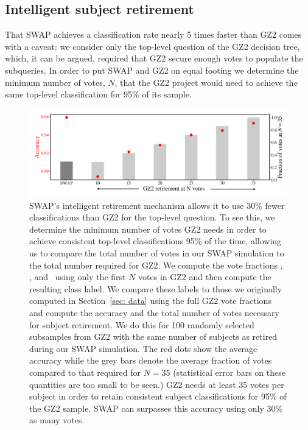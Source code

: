 \subsection{Intelligent subject retirement}\label{sec: swap is faster}

That SWAP achieves a classification rate nearly 5 times faster than GZ2 comes with a caveat: we consider only the top-level question of the GZ2 decision tree, which, it can be argued, required that GZ2 secure enough votes to populate the subqueries.  In order to put SWAP and GZ2 on equal footing we determine the minimum number of votes, $N$, that the GZ2 project would need to achieve the same top-level classification for 95\% of its sample.

\begin{figure}
\includegraphics[width=\linewidth]{Figures/human_machine/f15.pdf}
\caption[SWAP's intelligent retirement mechanism 3.5 times fewer classifications than GZ2.]{SWAP's intelligent retirement mechanism allows it to use 30\% fewer classifications than GZ2 for the top-level question. To see this, we determine the minimum number of votes GZ2 needs in order to achieve consistent top-level classifications 95\% of the time, allowing us to compare the total number of votes in our SWAP simulation to the total number required for GZ2. We compute the vote fractions \fsmooth, \ffeat, and \fstar~using only the first $N$ votes in GZ2 and then compute the resulting class label.  We compare these labels to those we originally computed in Section~\ref{sec: data} using the full GZ2 vote fractions and compute the accuracy and the total number of votes necessary for subject retirement. We do this for 100 randomly selected subsamples from GZ2 with the same number of subjects as retired during our SWAP simulation. The red dots show the average accuracy while the grey bars denote the average fraction of votes compared to that required for $N=35$ (statistical error bars on these quantities are too small to be seen.) GZ2 needs at least 35 votes per subject in order to retain consistent subject classifications for 95\% of the GZ2 sample. SWAP can surpasses this accuracy using only 30\% as many votes.}
\label{fig: gz2 min retirement}
\end{figure}

